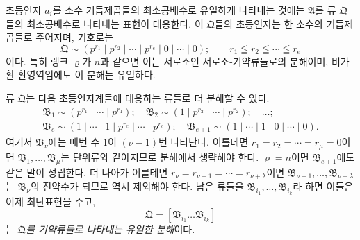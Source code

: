 초등인자 $a_i$를 소수 거듭제곱들의 최소공배수로 유일하게 나타내는 것에는 $\mathfrak A$를 류 $\mathfrak Q$들의 최소공배수로 나타내는 표현이 대응한다. 이 $\mathfrak Q$들의 초등인자는 한 소수의 거듭제곱들로 주어지며, 기호로는
\[
 \mathfrak Q\sim(p^{r_1}\mid p^{r_2}\mid\cdots\mid p^{r_e}\mid0\mid\cdots\mid0);
 \qquad r_1\leqq r_2\leqq\cdots\leqq r_e
\]
이다. 특히 랭크 $\varrho$가 $n$과 같으면 이는 서로소인 서로소-기약류들로의 분해이며, 비가환 환영역임에도 이 분해는 유일하다.

류 $\mathfrak Q$는 다음 초등인자계들에 대응하는 류들로 더 분해할 수 있다.
\[
\begin{gathered}
 \mathfrak B_1\sim(p^{r_1}\mid\cdots\mid p^{r_1});\quad
 \mathfrak B_2\sim(1\mid p^{r_2}\mid\cdots\mid p^{r_2});\quad \ldots;\\
 \mathfrak B_e\sim(1\mid\cdots\mid1\mid p^{r_e}\mid\cdots\mid p^{r_e});\quad
 \mathfrak B_{e+1}\sim(1\mid\cdots\mid1\mid0\mid\cdots\mid0).
\end{gathered}
\]
여기서 $\mathfrak B_\nu$에는 매번 수 $1$이 $(\nu-1)$번 나타난다. 이를테면 $r_1=r_2=\cdots=r_\mu=0$이면 $\mathfrak B_1,\ldots,\mathfrak B_\mu$는 단위류와 같아지므로 분해에서 생략해야 한다. $\varrho=n$이면 $\mathfrak B_{e+1}$에도 같은 말이 성립한다. 더 나아가 이를테면 $r_\nu=r_{\nu+1}=\cdots=r_{\nu+\lambda}$이면 $\mathfrak B_{\nu+1},\ldots,\mathfrak B_{\nu+\lambda}$는 $\mathfrak B_\nu$의 진약수가 되므로 역시 제외해야 한다. 남은 류들을 $\mathfrak B_{i_1},\ldots,\mathfrak B_{i_k}$라 하면 이들은 이제 최단표현을 주고,
\[
 \mathfrak Q=[\mathfrak B_{i_1}\ldots\mathfrak B_{i_k}]
\]
는 \emph{$\mathfrak Q$를 기약류들로 나타내는 유일한 분해}이다.

